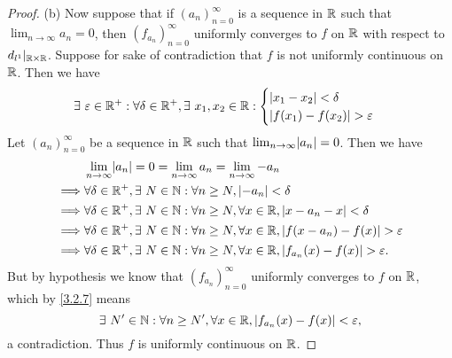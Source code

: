 \begin{proof}{(b)}
  Now suppose that if \((a_n)_{n = 0}^\infty\) is a sequence in \(\mathbb{R}\) such that \(\lim_{n \to \infty} a_n = 0\), then \((f_{a_n})_{n = 0}^\infty\) uniformly converges to \(f\) on \(\mathbb{R}\) with respect to \(d_{l^1}|_{\mathbb{R} \times \mathbb{R}}\).
  Suppose for sake of contradiction that \(f\) is not uniformly continuous on \(\mathbb{R}\).
  Then we have
  \[
    \exists\ \varepsilon \in \mathbb{R}^+ : \forall \delta \in \mathbb{R}^+, \exists\ x_1, x_2 \in \mathbb{R} : \begin{cases}
      \left\lvert x_1 - x_2\right\rvert < \delta \\
      \left\lvert f(x_1) - f(x_2)\right\rvert > \varepsilon
    \end{cases}
  \]
  Let \((a_n)_{n = 0}^\infty\) be a sequence in \(\mathbb{R}\) such that \(\lim_{n \to \infty} \abs{a_n} = 0\).
  Then we have
  \begin{align*}
             & \lim_{n \to \infty} \abs{a_n} = 0 = \lim_{n \to \infty} a_n = \lim_{n \to \infty} -a_n                                  \\
    \implies & \forall \delta \in \R^+, \exists\ N \in \N : \forall n \geq N, \abs{-a_n} < \delta                                      \\
    \implies & \forall \delta \in \R^+, \exists\ N \in \N : \forall n \geq N, \forall x \in \R, \abs{x - a_n - x} < \delta             \\
    \implies & \forall \delta \in \R^+, \exists\ N \in \N : \forall n \geq N, \forall x \in \R, \abs{f(x - a_n) - f(x)} > \varepsilon  \\
    \implies & \forall \delta \in \R^+, \exists\ N \in \N : \forall n \geq N, \forall x \in \R, \abs{f_{a_n}(x) - f(x)} > \varepsilon.
  \end{align*}
  But by hypothesis we know that \((f_{a_n})_{n = 0}^\infty\) uniformly converges to \(f\) on \(\mathbb{R}\), which by \cref{3.2.7} means
  \[
    \exists\ N' \in \mathbb{N} : \forall n \geq N', \forall x \in \mathbb{R}, \left\lvert f_{a_n}(x) - f(x)\right\rvert < \varepsilon,
  \]
  a contradiction.
  Thus \(f\) is uniformly continuous on \(\mathbb{R}\).
\end{proof}

